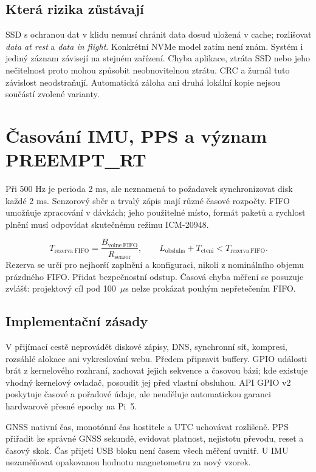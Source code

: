 \documentclass[11pt,a4paper]{article}
\newcommand{\novastrana}{\clearpage}
\begin{document}
\subsection{Která rizika zůstávají}
SSD s ochranou dat v klidu nemusí chránit data dosud uložená v cache; rozlišovat \emph{data at rest} a \emph{data in flight}. Konkrétní NVMe model zatím není znám.\cite{micron} Systém i jediný záznam závisejí na stejném zařízení. Chyba aplikace, ztráta SSD nebo jeho nečitelnost proto mohou způsobit neobnovitelnou ztrátu. CRC a žurnál tuto závislost neodstraňují. Automatická záloha ani druhá lokální kopie nejsou součástí zvolené varianty.

\novastrana
\section{Časování IMU, PPS a význam PREEMPT\_RT}
Při 500 Hz je perioda 2 ms, ale neznamená to požadavek synchronizovat disk každé 2 ms. Senzorový sběr a trvalý zápis mají různé časové rozpočty. FIFO umožňuje zpracování v dávkách; jeho použitelné místo, formát paketů a rychlost plnění musí odpovídat skutečnému režimu ICM-20948.\cite{projekt}

\begin{equation}
T_{\mathrm{rezerva\ FIFO}}=\frac{B_{\mathrm{volne\ FIFO}}}{R_{\mathrm{senzor}}},\qquad
L_{\mathrm{obsluha}}+T_{\mathrm{cteni}}<T_{\mathrm{rezerva\ FIFO}}.
\end{equation}
Rezerva se určí pro nejhorší zaplnění a konfiguraci, nikoli z nominálního objemu prázdného FIFO. Přidat bezpečnostní odstup. Časová chyba měření se posuzuje zvlášť: projektový cíl pod 100~$\mu$s nelze prokázat pouhým nepřetečením FIFO.

\subsection{Implementační zásady}
V přijímací cestě neprovádět diskové zápisy, DNS, synchronní síť, kompresi, rozsáhlé alokace ani vykreslování webu. Předem připravit buffery. GPIO události brát z kernelového rozhraní, zachovat jejich sekvence a časovou bázi; kde existuje vhodný kernelový ovladač, posoudit jej před vlastní obsluhou. API GPIO v2 poskytuje časové a pořadové údaje, ale neuděluje automatickou garanci hardwarově přesné epochy na Pi~5.\cite{gpio}

GNSS nativní čas, monotónní čas hostitele a UTC uchovávat rozlišeně. PPS přiřadit ke správné GNSS sekundě, evidovat platnost, nejistotu převodu, reset a časový skok. Čas přijetí USB bloku není časem všech měření uvnitř. U IMU nezaměňovat opakovanou hodnotu magnetometru za nový vzorek.
\end{document}
